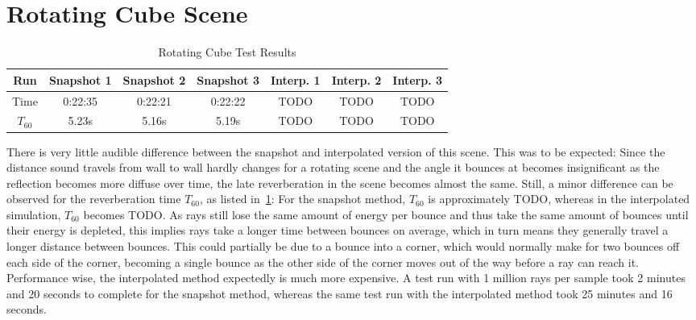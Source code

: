 \section{Rotating Cube Scene}

\begin{table}[t!]\label{tbl:CubeScene}
\centering
    \begin{tabular}{| c | c | c | c | c | c | c |}
        \hline
        Run & Snapshot 1 & Snapshot 2 & Snapshot 3 & Interp. 1 & Interp. 2 & Interp. 3 \\
        \hline
        Time & 0:22:35 & 0:22:21 & 0:22:22 & TODO & TODO & TODO \\
        \hline
        \(T_{60}\) & 5.23s & 5.16s & 5.19s & TODO & TODO & TODO \\
        \hline
    \end{tabular}
    \caption{Rotating Cube Test Results}
\end{table}
There is very little audible difference between the snapshot and interpolated version of this scene.
This was to be expected: Since the distance sound travels from wall to wall hardly changes for a rotating scene
and the angle it bounces at becomes insignificant as the reflection becomes more diffuse over time,
the late reverberation in the scene becomes almost the same.
\newline
Still, a minor difference can be observed for the reverberation time \(T_{60}\),
as listed in~\ref{tbl:CubeScene}:
For the snapshot method, \(T_{60}\) is approximately TODO,
whereas in the interpolated simulation, \(T_{60}\) becomes TODO.
\newline
As rays still lose the same amount of energy per bounce
and thus take the same amount of bounces until their energy is depleted,
this implies rays take a longer time between bounces on average,
which in turn means they generally travel a longer distance between bounces.
\newline
This could partially be due to a bounce into a corner,
which would normally make for two bounces off each side of the corner,
becoming a single bounce as the other side of the corner moves out of the way before a ray can reach it.
\newline
Performance wise, the interpolated method expectedly is much more expensive.
A test run with 1 million rays per sample took 2 minutes and 20 seconds to complete for the snapshot method,
whereas the same test run with the interpolated method took 25 minutes and 16 seconds.

